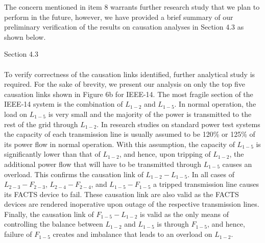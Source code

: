 \documentclass{article}
\newenvironment{response}{
  \doublespacing
  \setlength\parindent{0.05\linewidth}
  \ttfamily
}{}
\newenvironment{textblock}[1]
{\begin{tcolorbox}[breakable,enhanced]{#1 \\ \\}}
{\end{tcolorbox}}
\begin{document}
\begin{response}
The concern mentioned in item 8 warrants further research study that we plan to perform in the future, however, we have provided a brief summary of our preliminary verification of the results on causation analyses in Section 4.3 as shown below.

\begin{textblock}{Section 4.3}
To verify correctness of the causation links identified, further analytical study is required. For the sake of brevity, we present our analysis on only the top five causation links shown in Figure 6b for IEEE-14. The most fragile section of the IEEE-14 system is the combination of $L_{1-2}$ and $L_{1-5}$. In normal operation, the load on $L_{1-5}$ is very small and the majority of the power is transmitted to the rest of the grid through $L_{1-2}$. In research studies on standard power test systems the capacity of each transmission line is usually assumed to be 120\% or 125\% of its power flow in normal operation. With this assumption, the capacity of $L_{1-5}$ is significantly lower than that of $L_{1-2}$, and hence, upon tripping of $L_{1-2}$, the additional power flow that will have to be transmitted through $L_{1-5}$ causes an overload. This confirms the causation link of $L_{1-2} - L_{1-5}$. In all cases of $L_{2-3} - F_{2-3}$, $L_{2-4} - F_{2-4}$, and $L_{1-5} - F_{1-5}$ a tripped transmission line causes its FACTS device to fail. These causation link are also valid as the FACTS devices are rendered inoperative upon outage of the respective transmission lines. Finally, the causation link of $F_{1-5} - L_{1-2}$ is valid as the only means of controlling the balance between $L_{1-2}$ and $L_{1-5}$ is through $F_{1-5}$, and hence, failure of $F_{1-5}$ creates and imbalance that leads to an overload on $L_{1-2}$.
\end{textblock}

\end{response}
\end{document}
